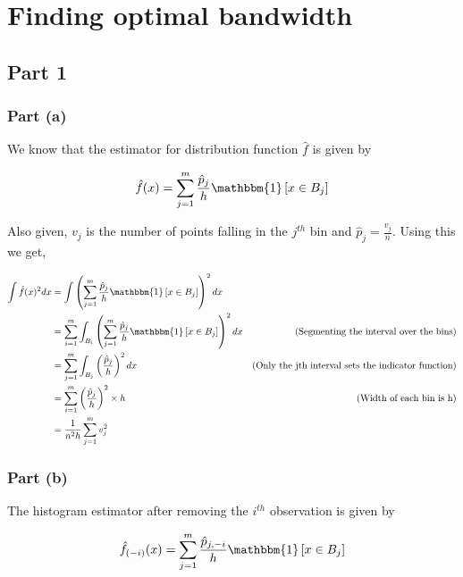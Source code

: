 \section{Finding optimal bandwidth}

\subsection{Part 1}
\subsubsection{Part (a)}

We know that the estimator for distribution function $\hat{f}$ is given by

\begin{equation}
    \hat{f}(x) = \sum_{j=1}^m \frac{\hat{p}_j}{h} \mathbbm{1}\left[x \in B_j\right]
\end{equation}

\hspace{-14pt}Also given, $v_j$ is the number of points falling in the $j^{th}$ bin and $\hat{p}_j = \frac{v_j}{n}$. Using this we get,

\begin{align*}
    \int \hat{f}(x)^2 dx &= \int \left(\sum_{j=1}^m \frac{\hat{p}_j}{h} \mathbbm{1}\left[x \in B_j\right]\right)^2 dx \\
    &= \sum_{i=1}^m \int_{B_i} \left(\sum_{j=1}^m \frac{\hat{p}_j}{h} \mathbbm{1}\left[x \in B_j\right]\right)^2 dx &\text{(Segmenting the interval over the bins)}\\
    &= \sum_{j=1}^m \int_{B_j} \left(\frac{\hat{p}_j}{h}\right)^2 dx &\text{(Only the jth interval sets the indicator function)}\\
    &= \sum_{i=1}^m \left(\frac{\hat{p}_j}{h}\right)^2 \times h &\text{(Width of each bin is h)}\\
    &= \frac{1}{n^2h} \sum_{j=1}^m v_j^2
\end{align*}

\subsubsection{Part (b)}

The histogram estimator after removing the $i^{th}$ observation is given by

\begin{equation}
    \hat{f}_{(-i)}(x) = \sum_{j=1}^m \frac{\hat{p}_{j, -i}}{h} \mathbbm{1}\left[x \in B_j\right]
\end{equation}

